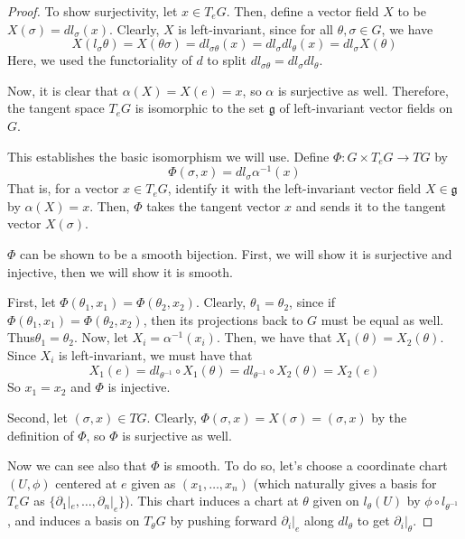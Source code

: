 \documentclass[fontsize=11pt]{scrartcl} %
\numberwithin{equation}{section} %
\numberwithin{figure}{section} %
\numberwithin{table}{section} %
\begin{document}
\begin{proof}
To show surjectivity, let $x\in T_eG$. Then, define a vector field $X$ to be $X(\sigma) = dl_{\sigma}(x)$.
Clearly, $X$ is left-invariant, since for all $\theta,\sigma \in G$, we have
\[
X(l_{\sigma}\theta) = X(\theta\sigma) = dl_{\sigma\theta}(x) = dl_{\sigma}dl_{\theta}(x) = dl_{\sigma}X(\theta)
\]
Here, we used the functoriality of $d$ to split $dl_{\sigma\theta} = dl_{\sigma}dl_{\theta}$.

Now, it is clear that $\alpha(X) = X(e) = x$, so $\alpha$ is surjective as well.
Therefore, the tangent space $T_eG$ is isomorphic to the set $\mathfrak{g}$ of left-invariant
vector fields on $G$. 

This establishes the basic isomorphism we will use. Define $\Phi:G\times T_eG\to TG$
by 
\[
\Phi(\sigma,x) = dl_{\sigma}\alpha^{-1}(x)
\] 
That is, for a vector $x\in T_eG$, identify
it with the left-invariant vector field $X\in\mathfrak{g}$ by $\alpha(X) = x$. Then,
$\Phi$ takes the tangent vector $x$ and sends it to the tangent vector $X(\sigma)$.

$\Phi$ can be shown to be a smooth bijection. First, we will show it is surjective and
injective, then we will show it is smooth.

First, let $\Phi(\theta_1,x_1) = \Phi(\theta_2,x_2)$. Clearly, $\theta_1 = \theta_2$, since
if $\Phi(\theta_1,x_1) = \Phi(\theta_2,x_2)$, then its projections back to $G$ must
be equal as well. Thus$\theta_1 =\theta_2$.
Now, let $X_i = \alpha^{-1}(x_i)$. Then, we have that $X_1(\theta)=X_2(\theta)$.
Since $X_i$ is left-invariant, we must have that
\[
X_1(e) = dl_{\theta^{-1}}\circ X_1(\theta) = dl_{\theta^{-1}}\circ X_2(\theta) = X_2(e)
\]
So $x_1 = x_2$ and $\Phi$ is injective.

Second, let $(\sigma,x)\in TG$. Clearly, $\Phi(\sigma,x) = X(\sigma) = (\sigma,x)$ by
the definition of $\Phi$, so $\Phi$ is surjective as well.

Now we can see also that $\Phi$ is smooth. To do so, let's choose a coordinate chart $(U,\phi)$
centered at $e$ given as $(x_1,\ldots,x_n)$ (which naturally gives a basis for $T_eG$
as $\{\partial_1|_e,\ldots,\partial_n|_e\}$).
This chart induces a chart at $\theta$ given on $l_{\theta}(U)$ by $\phi\circ l_{\theta^{-1}}$,
and induces a basis on $T_{\theta}G$ by pushing forward $\partial_i|_e$ along $dl_{\theta}$
to get $\partial_i|_{\theta}$.


\end{proof}
\end{document}
